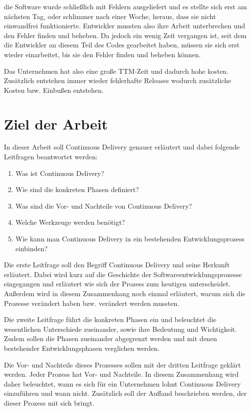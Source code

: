 die Software wurde schließlich mit Fehlern ausgeliefert und es stellte sich erst am nächsten Tag, oder schlimmer nach einer Woche, heraus, dass sie nicht einwandfrei funktionierte. Entwickler mussten also ihre Arbeit unterbrechen und den Fehler finden und beheben. Da jedoch ein wenig Zeit vergangen ist, seit dem die Entwickler an diesem Teil des Codes gearbeitet haben, müssen sie sich erst wieder einarbeitet, bis sie den Fehler finden und beheben können.

Das Unternehmen hat also eine große TTM-Zeit und dadurch hohe kosten. Zusätzlich entstehen immer wieder fehlerhafte Releases wodurch zusätzliche Kosten bzw. Einbußen entstehen.

\section{Ziel der Arbeit}
\label{sec:zielDerArbeit}
In dieser Arbeit soll Continuous Delivery genauer erläutert und dabei folgende Leitfragen beantwortet werden:

\begin{enumerate}
	\item Was ist Continuous Delivery?
	\item Wie sind die konkreten Phasen definiert?
	\item Was sind die Vor- und Nachteile von Continuous Delivery?
	\item Welche Werkzeuge werden benötigt?
	\item Wie kann man Continuous Delivery in ein bestehenden Entwicklungsprozess einbinden?
\end{enumerate}

Die erste Leitfrage soll den Begriff Continuous Delivery und seine Herkunft erläutert. Dabei wird kurz auf die Geschichte der Softwareentwicklungsprozesse eingegangen und erläutert wie sich der Prozess zum heutigen unterscheidet. Außerdem wird in diesem Zusammenhang noch einmal erläutert, warum sich die Prozesse verändert haben bzw. verändert werden mussten.

Die zweite Leitfrage führt die konkreten Phasen ein und beleuchtet die wesentlichen Unterschiede zueinander, sowie ihre Bedeutung und Wichtigkeit. Zudem sollen die Phasen zueinander abgegrenzt werden und mit denen bestehender Entwicklungsphasen verglichen werden.

Die Vor- und Nachteile dieses Prozesses sollen mit der dritten Leitfrage geklärt werden. Jeder Prozess hat Vor- und Nachteile. In diesem Zusammenhang wird daher beleuchtet, wann es sich für ein Unternehmen lohnt Continuous Delivery einzuführen und wann nicht. Zusätzlich soll der Auffand beschrieben werden, der dieser Prozess mit sich bringt.

